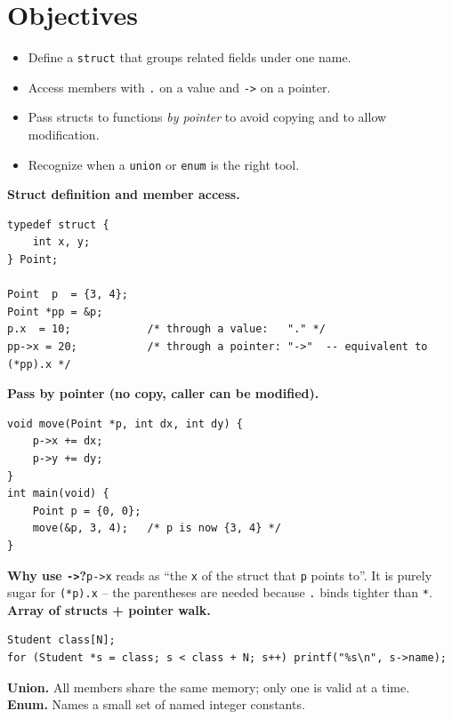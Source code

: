 \documentclass[11pt]{article}
\begin{document}
\labheader

\section*{Objectives}
\begin{itemize}[leftmargin=*,nosep]
  \item Define a \texttt{struct} that groups related fields under one name.
  \item Access members with \texttt{.} on a value and \texttt{->} on a pointer.
  \item Pass structs to functions \emph{by pointer} to avoid copying and to allow modification.
  \item Recognize when a \texttt{union} or \texttt{enum} is the right tool.
\end{itemize}

\begin{summary}
\textbf{Struct definition and member access.}
\begin{lstlisting}
typedef struct {
    int x, y;
} Point;

Point  p  = {3, 4};
Point *pp = &p;
p.x  = 10;            /* through a value:   "." */
pp->x = 20;           /* through a pointer: "->"  -- equivalent to (*pp).x */
\end{lstlisting}

\textbf{Pass by pointer (no copy, caller can be modified).}
\begin{lstlisting}
void move(Point *p, int dx, int dy) {
    p->x += dx;
    p->y += dy;
}
int main(void) {
    Point p = {0, 0};
    move(&p, 3, 4);   /* p is now {3, 4} */
}
\end{lstlisting}

\textbf{Why use \texttt{->}?}\quad \texttt{p->x} reads as ``the \texttt{x} of the
struct that \texttt{p} points to''. It is purely sugar for \texttt{(*p).x} -- the
parentheses are needed because \texttt{.} binds tighter than \texttt{*}.\\

\textbf{Array of structs + pointer walk.}
\begin{lstlisting}
Student class[N];
for (Student *s = class; s < class + N; s++) printf("%s\n", s->name);
\end{lstlisting}

\textbf{Union.} All members share the same memory; only one is valid at a time.\\
\textbf{Enum.} Names a small set of named integer constants.
\end{summary}
\end{document}
